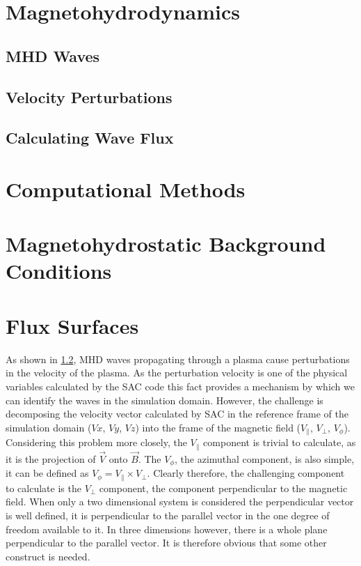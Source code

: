 \section{Magnetohydrodynamics}\label{sec:MHD}

\subsection{MHD Waves}\label{sec:MHDwaves}

\subsection{Velocity Perturbations}\label{sec:Vpert}

\subsection{Calculating Wave Flux}\label{sec:waveflux}

\section{Computational Methods}\label{sec:numericalmethods}

\section{Magnetohydrostatic Background Conditions}\label{sec:mhsbackground}

\section{Flux Surfaces}\label{sec:fluxsurfaces}

As shown in \cref{sec:Vpert}, MHD waves propagating through a plasma cause perturbations in the velocity of the plasma.
As the perturbation velocity is one of the physical variables calculated by the SAC code this fact provides a mechanism by which we can identify the waves in the simulation domain.
However, the challenge is decomposing the velocity vector calculated by SAC in the reference frame of the simulation domain ($Vx$, $Vy$, $Vz$) into the frame of the magnetic field ($V_\parallel$, $V_\perp$, $V_\phi$).
Considering this problem more closely, the $V_\parallel$ component is trivial to calculate, as it is the projection of $\vec{V}$ onto $\vec{B}$.
The $V_\phi$, the azimuthal component, is also simple, it can be defined as $V_\phi = V_\parallel \times V_\perp$.
Clearly therefore, the challenging component to calculate is the $V_\perp$ component, the component perpendicular to the magnetic field.
When only a two dimensional system is considered the perpendicular vector is well defined, it is perpendicular to the parallel vector in the one degree of freedom available to it.
In three dimensions however, there is a whole plane perpendicular to the parallel vector.
It is therefore obvious that some other construct is needed.

